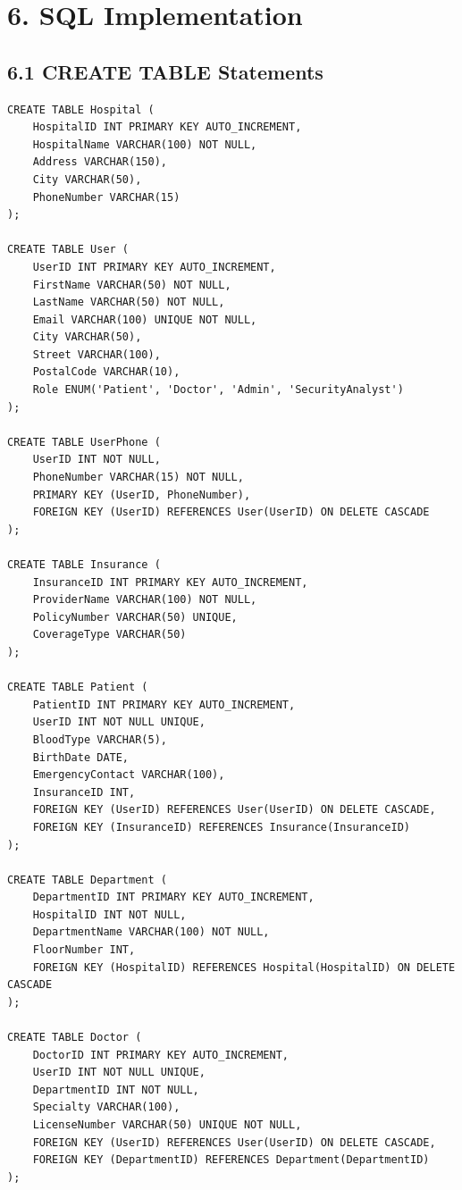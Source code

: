 \newpage
\section*{6. SQL Implementation}

\subsection*{6.1 CREATE TABLE Statements}

\begin{verbatim}
CREATE TABLE Hospital (
    HospitalID INT PRIMARY KEY AUTO_INCREMENT,
    HospitalName VARCHAR(100) NOT NULL,
    Address VARCHAR(150),
    City VARCHAR(50),
    PhoneNumber VARCHAR(15)
);

CREATE TABLE User (
    UserID INT PRIMARY KEY AUTO_INCREMENT,
    FirstName VARCHAR(50) NOT NULL,
    LastName VARCHAR(50) NOT NULL,
    Email VARCHAR(100) UNIQUE NOT NULL,
    City VARCHAR(50),
    Street VARCHAR(100),
    PostalCode VARCHAR(10),
    Role ENUM('Patient', 'Doctor', 'Admin', 'SecurityAnalyst')
);

CREATE TABLE UserPhone (
    UserID INT NOT NULL,
    PhoneNumber VARCHAR(15) NOT NULL,
    PRIMARY KEY (UserID, PhoneNumber),
    FOREIGN KEY (UserID) REFERENCES User(UserID) ON DELETE CASCADE
);

CREATE TABLE Insurance (
    InsuranceID INT PRIMARY KEY AUTO_INCREMENT,
    ProviderName VARCHAR(100) NOT NULL,
    PolicyNumber VARCHAR(50) UNIQUE,
    CoverageType VARCHAR(50)
);

CREATE TABLE Patient (
    PatientID INT PRIMARY KEY AUTO_INCREMENT,
    UserID INT NOT NULL UNIQUE,
    BloodType VARCHAR(5),
    BirthDate DATE,
    EmergencyContact VARCHAR(100),
    InsuranceID INT,
    FOREIGN KEY (UserID) REFERENCES User(UserID) ON DELETE CASCADE,
    FOREIGN KEY (InsuranceID) REFERENCES Insurance(InsuranceID)
);

CREATE TABLE Department (
    DepartmentID INT PRIMARY KEY AUTO_INCREMENT,
    HospitalID INT NOT NULL,
    DepartmentName VARCHAR(100) NOT NULL,
    FloorNumber INT,
    FOREIGN KEY (HospitalID) REFERENCES Hospital(HospitalID) ON DELETE CASCADE
);

CREATE TABLE Doctor (
    DoctorID INT PRIMARY KEY AUTO_INCREMENT,
    UserID INT NOT NULL UNIQUE,
    DepartmentID INT NOT NULL,
    Specialty VARCHAR(100),
    LicenseNumber VARCHAR(50) UNIQUE NOT NULL,
    FOREIGN KEY (UserID) REFERENCES User(UserID) ON DELETE CASCADE,
    FOREIGN KEY (DepartmentID) REFERENCES Department(DepartmentID)
);


\end{verbatim}
